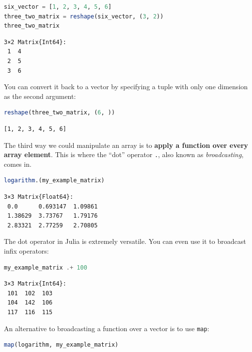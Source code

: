 \documentclass[
  notoc %
]{tufte-book}
\newcommand{\passthrough}[1]{#1}
\begin{document}
\begin{lstlisting}[language=Julia]
six_vector = [1, 2, 3, 4, 5, 6]
three_two_matrix = reshape(six_vector, (3, 2))
three_two_matrix
\end{lstlisting}

\begin{lstlisting}[language=Output]
3×2 Matrix{Int64}:
 1  4
 2  5
 3  6
\end{lstlisting}

You can convert it back to a vector by specifying a tuple with only one
dimension as the second argument:

\begin{lstlisting}[language=Julia]
reshape(three_two_matrix, (6, ))
\end{lstlisting}

\begin{lstlisting}[language=Output]
[1, 2, 3, 4, 5, 6]
\end{lstlisting}

The third way we could manipulate an array is to \textbf{apply a
function over every array element}. This is where the ``dot'' operator
\passthrough{\lstinline!.!}, also known as \emph{broadcasting}, comes
in.

\begin{lstlisting}[language=Julia]
logarithm.(my_example_matrix)
\end{lstlisting}

\begin{lstlisting}[language=Output]
3×3 Matrix{Float64}:
 0.0      0.693147  1.09861
 1.38629  3.73767   1.79176
 2.83321  2.77259   2.70805
\end{lstlisting}

The dot operator in Julia is extremely versatile. You can even use it to
broadcast infix operators:

\begin{lstlisting}[language=Julia]
my_example_matrix .+ 100
\end{lstlisting}

\begin{lstlisting}[language=Output]
3×3 Matrix{Int64}:
 101  102  103
 104  142  106
 117  116  115
\end{lstlisting}

An alternative to broadcasting a function over a vector is to use
\passthrough{\lstinline!map!}:

\begin{lstlisting}[language=Julia]
map(logarithm, my_example_matrix)
\end{lstlisting}
\end{document}

